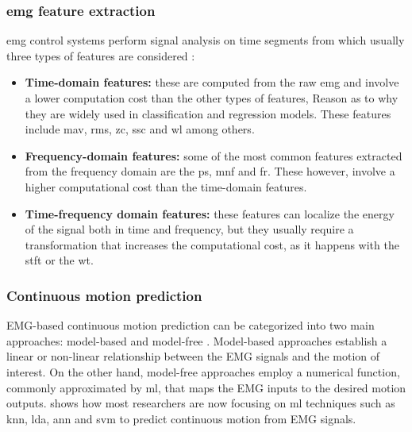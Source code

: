 \subsubsection{\acrshort{emg} feature extraction}

\acrshort{emg} control systems perform signal analysis on time segments from which usually three types of features are considered \cite{EMGprediction}:
\begin{itemize}
    \item \textbf{Time-domain features:} these are computed from the raw \acrfull{emg} and involve a lower computation cost than the other types of features,
    Reason as to why they are widely used in classification and regression models. These features include \acrfull{mav}, \acrfull{rms}, \acrfull{zc}, \acrfull{ssc} and \acrfull{wl}
    among others.
    \item \textbf{Frequency-domain features:} some of the most common features extracted from the frequency domain are the \acrfull{ps}, \acrfull{mnf} and \acrfull{fr}.
    These however, involve a higher computational cost than the time-domain features.
    \item \textbf{Time-frequency domain features:} these features can localize the energy of the signal both in time and frequency, but they usually
    require a transformation that increases the computational cost, as it happens with the \acrfull{stft} or the \acrfull{wt}.
\end{itemize}

\subsubsection{Continuous motion prediction}

EMG-based continuous motion prediction can be categorized into two main approaches: model-based and model-free \cite{EMGprediction}. Model-based approaches
establish a linear or non-linear relationship between the EMG signals and the motion of interest. On the other hand, model-free approaches
employ a numerical function, commonly approximated by \acrshort{ml}, that maps the EMG inputs to the desired motion outputs. \cite{ANNFuzzy} shows how most 
researchers are now focusing on \acrshort{ml} techniques such as \acrshort{knn}, \acrshort{lda}, \acrshort{ann} and \acrshort{svm} to predict continuous motion from EMG signals.


